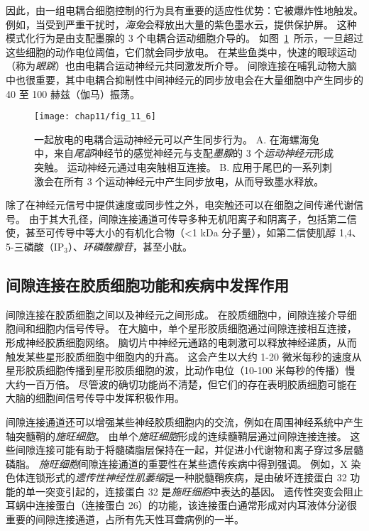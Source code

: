 因此，由一组电耦合细胞控制的行为具有重要的适应性优势：它被爆炸性地触发。
例如，当受到严重干扰时，\textit{海兔}会释放出大量的紫色墨水云，提供保护屏。
这种模式化行为是由支配墨腺的 3 个电耦合运动细胞介导的。
如图~\ref{fig:11_6}~所示，一旦超过这些细胞的动作电位阈值，它们就会同步放电。
在某些鱼类中，快速的眼球运动（称为\textit{眼跳}）也由电耦合运动神经元共同激发所介导。
间隙连接在哺乳动物大脑中也很重要，其中电耦合抑制性中间神经元的同步放电会在大量细胞中产生同步的 40 至 100 赫兹（伽马）振荡。


\begin{figure}[htbp]
	\centering
	\texttt{[image: chap11/fig\_11\_6]}
	\caption{一起放电的电耦合运动神经元可以产生同步行为\cite{carew1976two}。 
		A. 在海螺海兔中，来自\textit{尾部}神经节的感觉神经元与支配\textit{墨腺}的 3 个\textit{运动神经元}形成突触。
		运动神经元通过电突触相互连接。
		B. 应用于尾巴的一系列刺激会在所有 3 个运动神经元中产生同步放电，从而导致墨水释放。}
	\label{fig:11_6}
\end{figure}


除了在神经元信号中提供速度或同步性之外，电突触还可以在细胞之间传递代谢信号。
由于其大孔径，间隙连接通道可传导多种无机阳离子和阴离子，包括第二信使，甚至可传导中等大小的有机化合物（<1 kDa 分子量），如第二信使肌醇 1,4、 5-三磷酸（IP$_3$）、\textit{环磷酸腺苷}，甚至小肽。



\subsection{间隙连接在胶质细胞功能和疾病中发挥作用}

间隙连接在胶质细胞之间以及神经元之间形成。
在胶质细胞中，间隙连接介导细胞间和细胞内信号传导。 
在大脑中，单个星形胶质细胞通过间隙连接相互连接，形成神经胶质细胞网络。
脑切片中神经元通路的电刺激可以释放神经递质，从而触发某些星形胶质细胞中细胞内的升高。
这会产生以大约 1-20 微米每秒的速度从星形胶质细胞传播到星形胶质细胞的波，比动作电位（10-100 米每秒的传播）慢大约一百万倍。
尽管波的确切功能尚不清楚，但它们的存在表明胶质细胞可能在大脑的细胞间信号传导中发挥积极作用。


间隙连接通道还可以增强某些神经胶质细胞内的交流，例如在周围神经系统中产生轴突髓鞘的\textit{施旺细胞}。
由单个\textit{施旺细胞}形成的连续髓鞘层通过间隙连接连接。
这些间隙连接可能有助于将髓磷脂层保持在一起，并促进小代谢物和离子穿过多层髓磷脂。
\textit{施旺细胞}间隙连接通道的重要性在某些遗传疾病中得到强调。
例如，X 染色体连锁形式的\textit{遗传性神经性肌萎缩}是一种脱髓鞘疾病，是由破坏连接蛋白 32 功能的单一突变引起的，连接蛋白 32 是\textit{施旺细胞}中表达的基因。
遗传性突变会阻止耳蜗中连接蛋白（连接蛋白 26）的功能，该连接蛋白通常形成对内耳液体分泌很重要的间隙连接通道，占所有先天性耳聋病例的一半。



